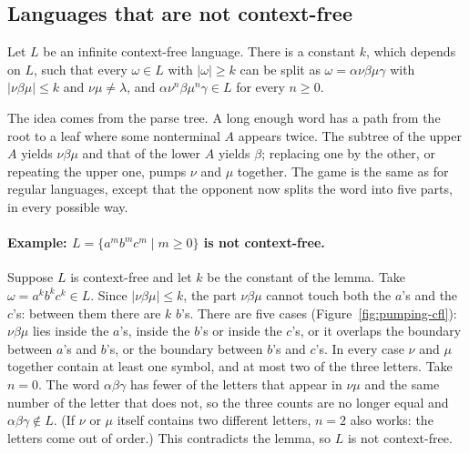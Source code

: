 \subsection{Languages that are not context-free}

\begin{lemma}
Let $L$ be an infinite context-free language. There is a constant $k$, which
depends on $L$, such that every $\omega \in L$ with $|\omega| \ge k$ can be split
as $\omega = \alpha\nu\beta\mu\gamma$ with $|\nu\beta\mu| \le k$ and $\nu\mu \ne \lambda$,
and $\alpha\nu^n\beta\mu^n\gamma \in L$ for every $n \ge 0$.
\end{lemma}

The idea comes from the parse tree. A long enough word has a path from the
root to a leaf where some nonterminal $A$ appears twice. The subtree of the
upper $A$ yields $\nu\beta\mu$ and that of the lower $A$ yields $\beta$; replacing
one by the other, or repeating the upper one, pumps $\nu$ and $\mu$ together.
The game is the same as for regular languages, except that the opponent now
splits the word into five parts, in every possible way.

\paragraph{Example: $L = \{a^m b^m c^m \mid m \ge 0\}$ is not context-free.}
Suppose $L$ is context-free and let $k$ be the constant of the lemma. Take
$\omega = a^k b^k c^k \in L$. Since $|\nu\beta\mu| \le k$, the part $\nu\beta\mu$ cannot
touch both the $a$'s and the $c$'s: between them there are $k$ $b$'s. There
are five cases (Figure~\ref{fig:pumping-cfl}): $\nu\beta\mu$ lies inside the
$a$'s, inside the $b$'s or inside the $c$'s, or it overlaps the boundary
between $a$'s and $b$'s, or the boundary between $b$'s and $c$'s. In every
case $\nu$ and $\mu$ together contain at least one symbol, and at most two of
the three letters. Take $n = 0$. The word $\alpha\beta\gamma$ has fewer of the
letters that appear in $\nu\mu$ and the same number of the letter that does
not, so the three counts are no longer equal and $\alpha\beta\gamma \notin L$. (If
$\nu$ or $\mu$ itself contains two different letters, $n = 2$ also works: the
letters come out of order.) This contradicts the lemma, so $L$ is not
context-free.

